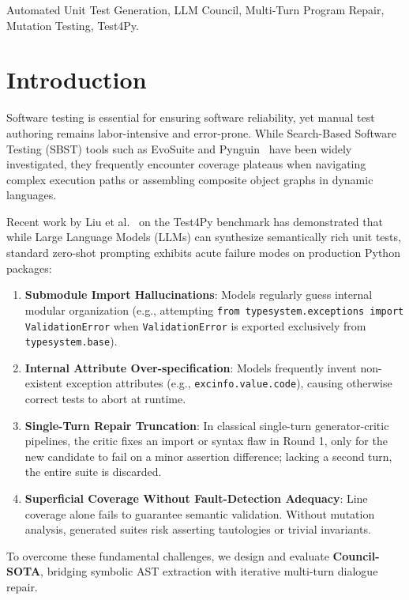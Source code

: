 \documentclass[conference]{IEEEtran}
\begin{document}
\begin{IEEEkeywords}
Automated Unit Test Generation, LLM Council, Multi-Turn Program Repair, Mutation Testing, Test4Py.
\end{IEEEkeywords}

\section{Introduction}
Software testing is essential for ensuring software reliability, yet manual test authoring remains labor-intensive and error-prone. While Search-Based Software Testing (SBST) tools such as EvoSuite and Pynguin~\cite{pynguin} have been widely investigated, they frequently encounter coverage plateaus when navigating complex execution paths or assembling composite object graphs in dynamic languages.

Recent work by Liu et al.~\cite{test4py} on the Test4Py benchmark has demonstrated that while Large Language Models (LLMs) can synthesize semantically rich unit tests, standard zero-shot prompting exhibits acute failure modes on production Python packages:
\begin{enumerate}
    \item \textbf{Submodule Import Hallucinations}: Models regularly guess internal modular organization (e.g., attempting \texttt{from typesystem.exceptions import ValidationError} when \texttt{ValidationError} is exported exclusively from \texttt{typesystem.base}).
    \item \textbf{Internal Attribute Over-specification}: Models frequently invent non-existent exception attributes (e.g., \texttt{excinfo.value.code}), causing otherwise correct tests to abort at runtime.
    \item \textbf{Single-Turn Repair Truncation}: In classical single-turn generator-critic pipelines, the critic fixes an import or syntax flaw in Round 1, only for the new candidate to fail on a minor assertion difference; lacking a second turn, the entire suite is discarded.
    \item \textbf{Superficial Coverage Without Fault-Detection Adequacy}: Line coverage alone fails to guarantee semantic validation. Without mutation analysis, generated suites risk asserting tautologies or trivial invariants.
\end{enumerate}

To overcome these fundamental challenges, we design and evaluate \textbf{Council-SOTA}, bridging symbolic AST extraction with iterative multi-turn dialogue repair.
\end{document}
